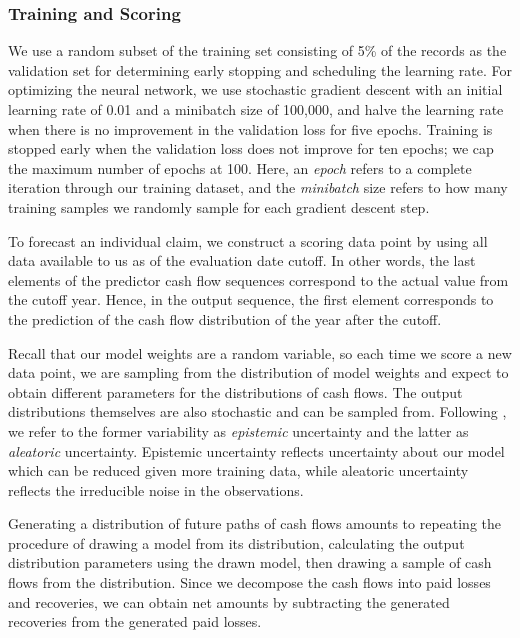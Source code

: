 \documentclass{article}
\begin{document}
\subsubsection{Training and Scoring}

We use a random subset of the training set consisting of 5\% of the records as the validation set for determining early stopping and scheduling the learning rate. For optimizing the neural network, we use stochastic gradient descent with an initial learning rate of 0.01 and a minibatch size of 100,000, and halve the learning rate when there is no improvement in the validation loss for five epochs. Training is stopped early when the validation loss does not improve for ten epochs; we cap the maximum number of epochs at 100. Here, an \textit{epoch} refers to a complete iteration through our training dataset, and the \textit{minibatch} size refers to how many training samples we randomly sample for each gradient descent step.

To forecast an individual claim, we construct a scoring data point by using all data available to us as of the evaluation date cutoff. In other words, the last elements of the predictor cash flow sequences correspond to the actual value from the cutoff year. Hence, in the output sequence, the first element corresponds to the prediction of the cash flow distribution of the year after the cutoff.

Recall that our model weights are a random variable, so each time we score a new data point, we are sampling from the distribution of model weights and expect to obtain different parameters for the distributions of cash flows. The output distributions themselves are also stochastic and can be sampled from. Following \cite{NIPS2017_7141}, we refer to the former variability as \textit{epistemic} uncertainty and the latter as \textit{aleatoric} uncertainty. Epistemic uncertainty reflects uncertainty about our model which can be reduced given more training data, while aleatoric uncertainty reflects the irreducible noise in the observations.

Generating a distribution of future paths of cash flows amounts to repeating the procedure of drawing a model from its distribution, calculating the output distribution parameters using the drawn model, then drawing a sample of cash flows from the distribution. Since we decompose the cash flows into paid losses and recoveries, we can obtain net amounts by subtracting the generated recoveries from the generated paid losses.
\end{document}
